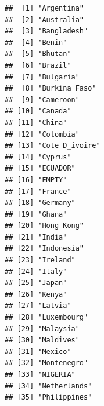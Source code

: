 \documentclass[
]{article}
\newenvironment{Shaded}{\begin{snugshade}}{\end{snugshade}}
\newcommand{\CommentTok}[1]{\textcolor[rgb]{0.56,0.35,0.01}{\textit{#1}}}
\newcommand{\FunctionTok}[1]{\textcolor[rgb]{0.13,0.29,0.53}{\textbf{#1}}}
\newcommand{\NormalTok}[1]{#1}
\newcommand{\SpecialCharTok}[1]{\textcolor[rgb]{0.81,0.36,0.00}{\textbf{#1}}}
\begin{document}
\begin{Shaded}
\end{Shaded}

\begin{verbatim}
##  [1] "Argentina"                                         
##  [2] "Australia"                                         
##  [3] "Bangladesh"                                        
##  [4] "Benin"                                             
##  [5] "Bhutan"                                            
##  [6] "Brazil"                                            
##  [7] "Bulgaria"                                          
##  [8] "Burkina Faso"                                      
##  [9] "Cameroon"                                          
## [10] "Canada"                                            
## [11] "China"                                             
## [12] "Colombia"                                          
## [13] "Cote D_ivoire"                                     
## [14] "Cyprus"                                            
## [15] "ECUADOR"                                           
## [16] "EMPTY"                                             
## [17] "France"                                            
## [18] "Germany"                                           
## [19] "Ghana"                                             
## [20] "Hong Kong"                                         
## [21] "India"                                             
## [22] "Indonesia"                                         
## [23] "Ireland"                                           
## [24] "Italy"                                             
## [25] "Japan"                                             
## [26] "Kenya"                                             
## [27] "Latvia"                                            
## [28] "Luxembourg"                                        
## [29] "Malaysia"                                          
## [30] "Maldives"                                          
## [31] "Mexico"                                            
## [32] "Montenegro"                                        
## [33] "NIGERIA"                                           
## [34] "Netherlands"                                       
## [35] "Philippines"                                       

\end{verbatim}
\end{document}
